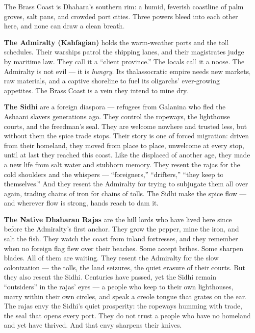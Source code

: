 \vspace{2mm}
\begin{tcolorbox}[colback=black!3,colframe=blue!60!black,title={Theme \& Atmosphere},breakable]
The Brass Coast is Dhahara's southern rim: a humid, feverish coastline of palm groves, salt pans, and crowded port cities. Three powers bleed into each other here, and none can draw a clean breath.

\noindent
\textbf{The Admiralty (Kahfagian)} holds the warm-weather ports and the toll schedules. Their warships patrol the shipping lanes, and their magistrates judge by maritime law. They call it a ``client province.'' The locals call it a noose. The Admiralty is not evil --- it is \emph{hungry}. Its thalassocratic empire needs new markets, raw materials, and a captive shoreline to fuel its oligarchs' ever-growing appetites. The Brass Coast is a vein they intend to mine dry.

\noindent
\textbf{The Sidhi} are a foreign diaspora --- refugees from Galanina who fled the Ashaani slavers generations ago. They control the ropeways, the lighthouse courts, and the freedman's seal. They are welcome nowhere and trusted less, but without them the spice trade stops. Their story is one of forced migration: driven from their homeland, they moved from place to place, unwelcome at every stop, until at last they reached this coast. Like the displaced of another age, they made a new life from salt water and stubborn memory. They resent the rajas for the cold shoulders and the whispers --- ``foreigners,'' ``drifters,'' ``they keep to themselves.'' And they resent the Admiralty for trying to subjugate them all over again, trading chains of iron for chains of tolls. The Sidhi make the spice flow --- and wherever flow is strong, hands reach to dam it.

\noindent
\textbf{The Native Dhaharan Rajas} are the hill lords who have lived here since before the Admiralty's first anchor. They grow the pepper, mine the iron, and salt the fish. They watch the coast from inland fortresses, and they remember when no foreign flag flew over their beaches. Some accept bribes. Some sharpen blades. All of them are waiting. They resent the Admiralty for the slow colonization --- the tolls, the land seizures, the quiet erasure of their courts. But they also resent the Sidhi. Centuries have passed, yet the Sidhi remain ``outsiders'' in the rajas' eyes --- a people who keep to their own lighthouses, marry within their own circles, and speak a creole tongue that grates on the ear. The rajas envy the Sidhi's quiet prosperity: the ropeways humming with trade, the seal that opens every port. They do not trust a people who have no homeland and yet have thrived. And that envy sharpens their knives.


\end{tcolorbox}
